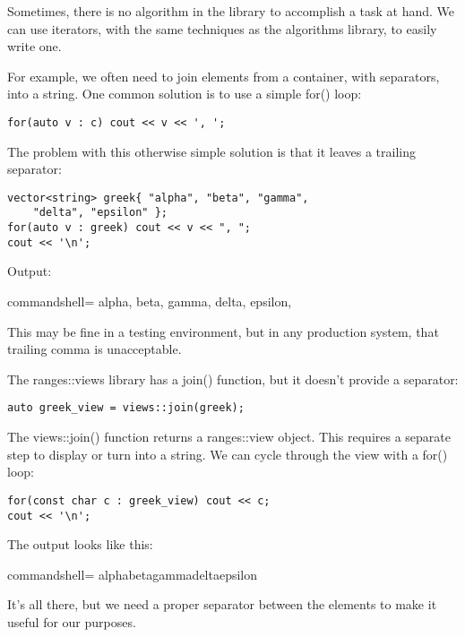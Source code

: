 
Sometimes, there is no algorithm in the library to accomplish a task at hand. We can use iterators, with the same techniques as the algorithms library, to easily write one.

For example, we often need to join elements from a container, with separators, into a string. One common solution is to use a simple for() loop:

\begin{lstlisting}[style=styleCXX]
for(auto v : c) cout << v << ', ';
\end{lstlisting}

The problem with this otherwise simple solution is that it leaves a trailing separator:

\begin{lstlisting}[style=styleCXX]
vector<string> greek{ "alpha", "beta", "gamma",
	"delta", "epsilon" };
for(auto v : greek) cout << v << ", ";
cout << '\n';
\end{lstlisting}

Output:

\begin{tcblisting}{commandshell={}}
alpha, beta, gamma, delta, epsilon,
\end{tcblisting}

This may be fine in a testing environment, but in any production system, that trailing comma is unacceptable.

The ranges::views library has a join() function, but it doesn't provide a separator:

\begin{lstlisting}[style=styleCXX]
auto greek_view = views::join(greek);
\end{lstlisting}

The views::join() function returns a ranges::view object. This requires a separate step to display or turn into a string. We can cycle through the view with a for() loop:

\begin{lstlisting}[style=styleCXX]
for(const char c : greek_view) cout << c;
cout << '\n';
\end{lstlisting}

The output looks like this:

\begin{tcblisting}{commandshell={}}
alphabetagammadeltaepsilon
\end{tcblisting}

It's all there, but we need a proper separator between the elements to make it useful for our purposes.

